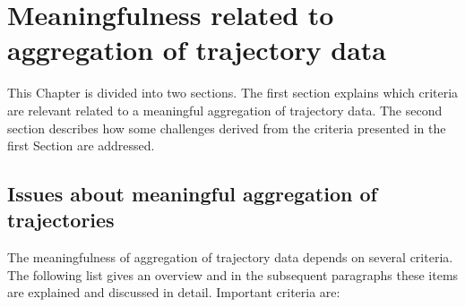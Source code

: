 \documentclass[12pt, oneside, a4paper]{scrbook}
\begin{document}

\chapter{Meaningfulness related to aggregation of trajectory data}
\label{chap:meaningful}

This Chapter is divided into two sections. 
The first section explains which criteria are relevant related to a meaningful aggregation of trajectory data. 
The second section describes how some challenges derived from the criteria presented in the first Section are addressed.


\section{Issues about meaningful aggregation of trajectories}
\label{sec:meaningfulissues}

The meaningfulness of aggregation of trajectory data depends on several criteria. The following list gives an overview and in the subsequent paragraphs these items are explained and discussed in detail. Important criteria are: %
\end{document}
